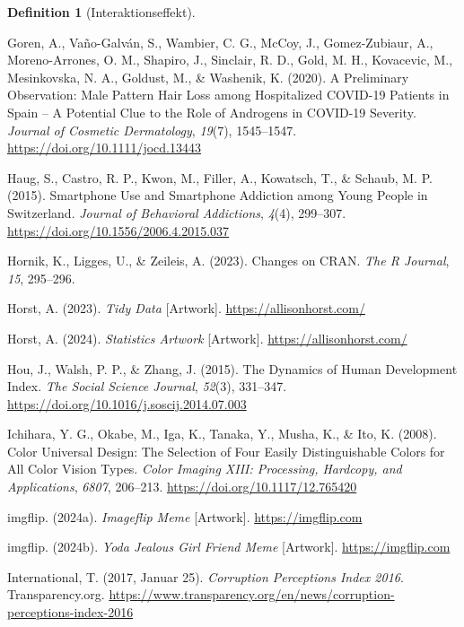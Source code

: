 \documentclass[
  letterpaper,
]{scrbook}
\newlength{\cslhangindent}
\newenvironment{CSLReferences}[2] %
 {\begin{list}{}{%
  \setlength{\itemindent}{0pt}
  \setlength{\leftmargin}{0pt}
  \setlength{\parsep}{0pt}
  \ifodd #1
   \setlength{\leftmargin}{\cslhangindent}
   \setlength{\itemindent}{-1\cslhangindent}
  \fi
  \setlength{\itemsep}{#2\baselineskip}}}
 {\end{list}}
\theoremstyle{definition}
\theoremstyle{definition}
\theoremstyle{definition}
\newtheorem{definition}{Definition}[chapter]
\theoremstyle{remark}
\begin{document}
\begin{definition}[Interaktionseffekt]
\begin{CSLReferences}{1}{0}
Goren, A., Vaño-Galván, S., Wambier, C. G., McCoy, J., Gomez-Zubiaur,
A., Moreno-Arrones, O. M., Shapiro, J., Sinclair, R. D., Gold, M. H.,
Kovacevic, M., Mesinkovska, N. A., Goldust, M., \& Washenik, K. (2020).
A Preliminary Observation: {Male} Pattern Hair Loss among Hospitalized
{COVID-19} Patients in {Spain} -- {A} Potential Clue to the Role of
Androgens in {COVID-19} Severity. \emph{Journal of Cosmetic
Dermatology}, \emph{19}(7), 1545--1547.
\url{https://doi.org/10.1111/jocd.13443}

Haug, S., Castro, R. P., Kwon, M., Filler, A., Kowatsch, T., \& Schaub,
M. P. (2015). Smartphone Use and Smartphone Addiction among Young People
in {Switzerland}. \emph{Journal of Behavioral Addictions}, \emph{4}(4),
299--307. \url{https://doi.org/10.1556/2006.4.2015.037}

Hornik, K., Ligges, U., \& Zeileis, A. (2023). Changes on CRAN.
\emph{The R Journal}, \emph{15}, 295--296.

Horst, A. (2023). \emph{Tidy {Data}} {[}Artwork{]}.
\url{https://allisonhorst.com/}

Horst, A. (2024). \emph{Statistics {Artwork}} {[}Artwork{]}.
\url{https://allisonhorst.com/}

Hou, J., Walsh, P. P., \& Zhang, J. (2015). The Dynamics of {Human
Development Index}. \emph{The Social Science Journal}, \emph{52}(3),
331--347. \url{https://doi.org/10.1016/j.soscij.2014.07.003}

Ichihara, Y. G., Okabe, M., Iga, K., Tanaka, Y., Musha, K., \& Ito, K.
(2008). Color Universal Design: The Selection of Four Easily
Distinguishable Colors for All Color Vision Types. \emph{Color {Imaging
XIII}: {Processing}, {Hardcopy}, and {Applications}}, \emph{6807},
206--213. \url{https://doi.org/10.1117/12.765420}

imgflip. (2024a). \emph{Imageflip {Meme}} {[}Artwork{]}.
\url{https://imgflip.com}

imgflip. (2024b). \emph{Yoda {Jealous Girl Friend Meme}} {[}Artwork{]}.
\url{https://imgflip.com}

International, T. (2017, Januar 25). \emph{Corruption {Perceptions
Index} 2016}. Transparency.org.
\url{https://www.transparency.org/en/news/corruption-perceptions-index-2016}


\end{CSLReferences}
\end{definition}
\end{document}
